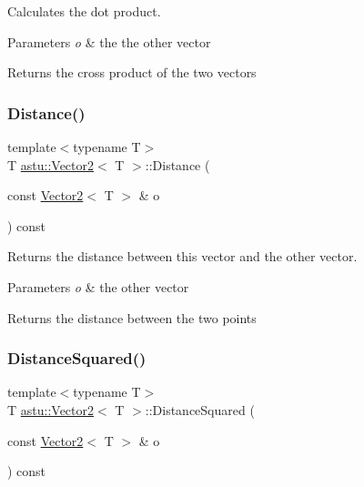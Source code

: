 Calculates the dot product.


\begin{DoxyParams}{Parameters}
{\em o} & the the other vector \\
\hline
\end{DoxyParams}
\begin{DoxyReturn}{Returns}
the cross product of the two vectors 
\end{DoxyReturn}
\mbox{\label{classastu_1_1Vector2_a504029e7043988ec1e697b1a1e2cfb78}} 
\subsubsection{\texorpdfstring{Distance()}{Distance()}}
{\footnotesize\ttfamily template$<$typename T$>$ \\
T \hyperlink{classastu_1_1Vector2}{astu\+::\+Vector2}$<$ T $>$\+::Distance (\begin{DoxyParamCaption}\item[{const \hyperlink{classastu_1_1Vector2}{Vector2}$<$ T $>$ \&}]{o }\end{DoxyParamCaption}) const\hspace{0.3cm}{\ttfamily [inline]}}

Returns the distance between this vector and the other vector.


\begin{DoxyParams}{Parameters}
{\em o} & the other vector \\
\hline
\end{DoxyParams}
\begin{DoxyReturn}{Returns}
the distance between the two points 
\end{DoxyReturn}
\mbox{\label{classastu_1_1Vector2_ac60cbccfefd62216f648c388c5025649}} 
\subsubsection{\texorpdfstring{Distance\+Squared()}{DistanceSquared()}}
{\footnotesize\ttfamily template$<$typename T$>$ \\
T \hyperlink{classastu_1_1Vector2}{astu\+::\+Vector2}$<$ T $>$\+::Distance\+Squared (\begin{DoxyParamCaption}\item[{const \hyperlink{classastu_1_1Vector2}{Vector2}$<$ T $>$ \&}]{o }\end{DoxyParamCaption}) const\hspace{0.3cm}{\ttfamily [inline]}}


